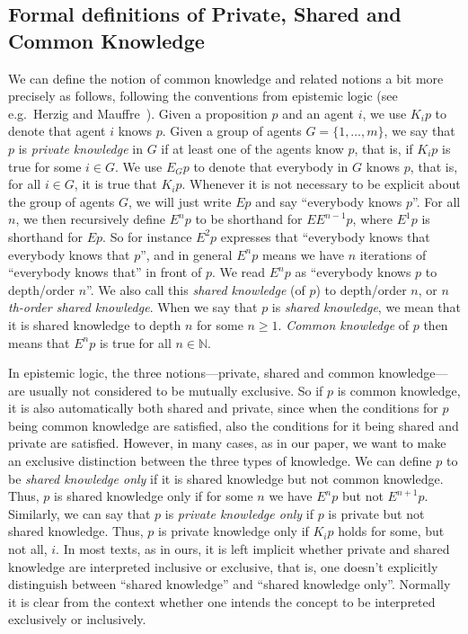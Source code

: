 \documentclass[a4paper,superscriptaddress,nofootinbib]{revtex4}
\begin{document}
\subsection{Formal definitions of Private, Shared and Common Knowledge}
\label{A:definitions}
We can define the notion of common knowledge and related notions a bit more precisely as follows, following the conventions from epistemic logic (see e.g.\ Herzig and Mauffre~\cite{herzig2015share}). Given a proposition $p$ and an agent $i$, we use $K_i p$ to denote that agent $i$ knows $p$. Given a group of agents $G = \{1,\dots,m\}$, we say that $p$ is \emph{private knowledge} in $G$ if at least one of the agents know $p$, that is, if $K_i p$ is true for some $i \in G$. We use $E_G p$ to denote that everybody in $G$ knows $p$, that is, for all $i \in G$, it is true that $K_i p$. Whenever it is not necessary to be explicit about the group of agents $G$, we will just write $E p$ and say ``everybody knows $p$''. For all $n$, we then recursively define $E^n p$ to be shorthand for $E E^{n-1} p$, where $E^1 p$ is shorthand for $E p$. So for instance $E^2 p$ expresses that ``everybody knows that everybody knows that $p$'', and in general $E^n p$ means we have $n$ iterations of ``everybody knows that'' in front of $p$. We read $E^n p$ as ``everybody knows $p$ to depth/order $n$''. We also call this \emph{shared knowledge} (of $p$) to depth/order $n$, or \emph{$n$th-order shared knowledge}. When we say that $p$ is \emph{shared knowledge}, we mean that it is shared knowledge to depth $n$ for some $n \geq 1$. \emph{Common knowledge} of $p$ then means that $E^n p$ is true for all $n \in \mathbb{N}$.

In epistemic logic, the three notions---private, shared and common knowledge---are usually not considered to be mutually exclusive. So if $p$ is common knowledge, it is also automatically both shared and private, since when the conditions for $p$ being common knowledge are satisfied, also the conditions for it being shared and private are satisfied. However, in many cases, as in our paper, we want to make an exclusive distinction between the three types of knowledge. We can define $p$ to be \emph{shared knowledge only} if it is shared knowledge but not common knowledge. Thus, $p$ is shared knowledge only if for some $n$ we have $E^n p$ but not $E^{n+1} p$. Similarly, we can say that $p$ is \emph{private knowledge only} if $p$ is private but not shared knowledge. Thus, $p$ is private knowledge only if $K_i p$ holds for some, but not all, $i$. In most texts, as in ours, it is left implicit whether private and shared knowledge are interpreted inclusive or exclusive, that is, one doesn't explicitly distinguish between ``shared knowledge'' and ``shared knowledge only''. Normally it is clear from the context whether one intends the concept to be interpreted exclusively or inclusively. 
\end{document}
